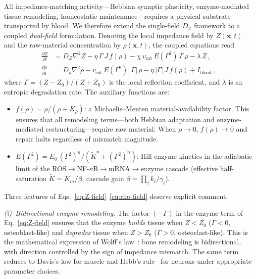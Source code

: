 ﻿\documentclass[aps,pre,twocolumn,superscriptaddress,floatfix]{revtex4-2}
\begin{document}
All impedance-matching activity---Hebbian synaptic
plasticity, enzyme-mediated tissue remodeling, homeostatic
maintenance---requires a physical substrate transported by blood.
We therefore extend the single-field $D_Z$ framework to a
coupled \emph{dual-field} formulation.
Denoting the local impedance field by $Z(\mathbf{x},t)$ and
the raw-material concentration by $\rho(\mathbf{x},t)$, the
coupled equations read
\begin{align}
  \frac{\partial Z}{\partial t}
  &= D_Z\nabla^2 Z
   - \eta\,\Gamma\,J\,f(\rho)
   - \chi\,v_{\mathrm{cat}}\,E(\Gamma^2)\,\Gamma\,\rho
   - \lambda\,Z\,,
  \label{eq:Z-field}
  \\[4pt]
  \frac{\partial \rho}{\partial t}
  &= D_\rho\nabla^2\rho
   - v_{\mathrm{cat}}\,E(\Gamma^2)\,|\Gamma|\,\rho
   - \eta\,|\Gamma|\,J\,f(\rho)
   + I_{\mathrm{blood}}\,,
  \label{eq:rho-field}
\end{align}
where $\Gamma = (Z - Z_0)/(Z + Z_0)$ is the local
reflection coefficient, and $\lambda$ is an entropic
degradation rate.
The auxiliary functions are:
\begin{itemize}
  \item $f(\rho) = \rho/(\rho + K_\rho)$: a Michaelis--Menten
    material-availability factor.
    This ensures that all remodeling terms---both Hebbian
    adaptation and enzyme-mediated restructuring---require
    raw material.
    When $\rho \to 0$, $f(\rho) \to 0$ and repair halts
    regardless of mismatch magnitude.
  \item $E(\Gamma^2) = E_0\,
    (\Gamma^2)^n / (\tilde{K}^n + (\Gamma^2)^n)$:
    Hill enzyme kinetics in the adiabatic limit of the
    ROS${\to}$NF-$\kappa$B${\to}$mRNA${\to}$enzyme cascade
    (effective half-saturation $\tilde{K} = K_m/\beta$,
    cascade gain $\beta = \prod_i k_i/\gamma_i$).
\end{itemize}

Three features of Eqs.~\eqref{eq:Z-field}--\eqref{eq:rho-field}
deserve explicit comment.

\emph{(i)~Bidirectional enzyme remodeling.}
The factor $(-\Gamma)$ in the enzyme term of Eq.~\eqref{eq:Z-field}
ensures that the enzyme \emph{builds} tissue when $Z < Z_0$
($\Gamma < 0$, osteoblast-like) and \emph{degrades} tissue
when $Z > Z_0$ ($\Gamma > 0$, osteoclast-like).
This is the mathematical expression of Wolff's law~\cite{Wolff1892}:
bone remodeling is bidirectional, with direction
controlled by the sign of impedance mismatch.
The same term reduces to Davis's law for muscle
and Hebb's rule~\cite{Hebb1949} for neurons
under appropriate parameter choices.
\end{document}
